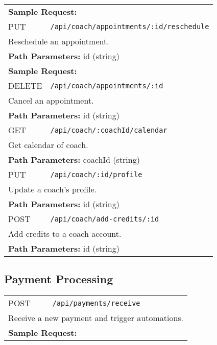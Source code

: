 \documentclass[11pt,a4paper]{article}
\begin{document}
\begin{longtable}{p{2.5cm}p{10cm}}
\multicolumn{2}{p{13cm}}{\textbf{Sample Request:}}
\begin{lstlisting}[language=json]
{"leadId":"64f1a2b3c4d5e6f7a8b9c0d3","startTime":"2025-01-21T09:00:00Z","duration":30,"notes":"Intro call","timeZone":"Asia/Kolkata"}
\end{lstlisting} \\
PUT & \texttt{/api/coach/appointments/:id/reschedule} \\
\multicolumn{2}{p{13cm}}{Reschedule an appointment.} \\
\multicolumn{2}{p{13cm}}{\textbf{Path Parameters:} id (string)} \\
\multicolumn{2}{p{13cm}}{\textbf{Sample Request:}}
\begin{lstlisting}[language=json]
{"newStartTime":"2025-01-22T10:00:00Z","newDuration":45}
\end{lstlisting} \\
DELETE & \texttt{/api/coach/appointments/:id} \\
\multicolumn{2}{p{13cm}}{Cancel an appointment.} \\
\multicolumn{2}{p{13cm}}{\textbf{Path Parameters:} id (string)} \\
GET & \texttt{/api/coach/:coachId/calendar} \\
\multicolumn{2}{p{13cm}}{Get calendar of coach.} \\
\multicolumn{2}{p{13cm}}{\textbf{Path Parameters:} coachId (string)} \\
PUT & \texttt{/api/coach/:id/profile} \\
\multicolumn{2}{p{13cm}}{Update a coach's profile.} \\
\multicolumn{2}{p{13cm}}{\textbf{Path Parameters:} id (string)} \\
POST & \texttt{/api/coach/add-credits/:id} \\
\multicolumn{2}{p{13cm}}{Add credits to a coach account.} \\
\multicolumn{2}{p{13cm}}{\textbf{Path Parameters:} id (string)} \\
\end{longtable}

\subsection{Payment Processing}
\begin{longtable}{p{2.5cm}p{10cm}}
POST & \texttt{/api/payments/receive} \\
\multicolumn{2}{p{13cm}}{Receive a new payment and trigger automations.} \\
\multicolumn{2}{p{13cm}}{\textbf{Sample Request:}}
\begin{lstlisting}[language=json]
{"paymentId":"gw_123","leadId":"64f1a2b3c4d5e6f7a8b9c0d3","amount":4999,"currency":"INR","status":"successful","paymentMethod":"card","gatewayResponse":{"id":"gw_123","sig":"..."}}
\end{lstlisting} \\
\end{longtable}
\end{document}
